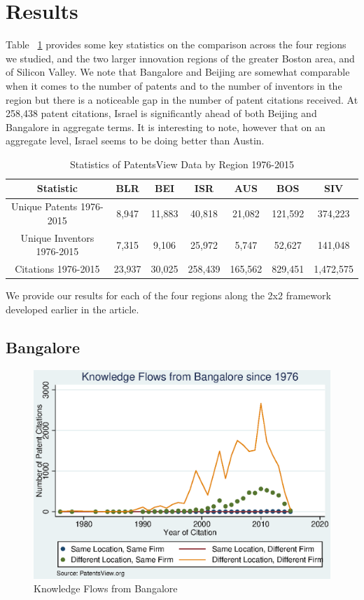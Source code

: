 \documentclass[12pt]{article}
\begin{document}
\section{Results}
Table ~\ref{table:regions} provides some key statistics on the comparison across the four regions we studied, and the two larger innovation regions of the greater Boston area, and of Silicon Valley. We note that Bangalore and Beijing are somewhat comparable when it comes to the number of patents and to the number of inventors in the region but there is a noticeable gap in the number of patent citations received. At 258,438 patent citations, Israel is significantly ahead of both Beijing and Bangalore in aggregate terms. It is interesting to note, however that on an aggregate level, Israel seems to be doing better than Austin.


\begin{table}
\begin{centering}
\label{table:regions}
\begin{tabular}{|c|c|c|c|c|c|c|}
\hline
Statistic&BLR&BEI&ISR&AUS&BOS&SIV\\ \hline
Unique Patents 1976-2015&8,947&11,883&40,818&21,082&121,592&374,223 \\ \hline
Unique Inventors 1976-2015&7,315&9,106&25,972&5,747&52,627&141,048\\ \hline
Citations 1976-2015&23,937&30,025&258,439&165,562&829,451&1,472,575\\ \hline
\end{tabular}
\caption {Statistics of PatentsView Data by Region 1976-2015}
\end{centering}
\end{table}

We provide our results for each of the four regions along the 2x2 framework developed earlier in the article. 
\subsection{Bangalore}

\begin{figure}[h]
\begin{centering}
  \includegraphics[width=\textwidth]{Bangalore1976}
  \caption{Knowledge Flows from Bangalore}
  \label{fig:Bangalore1976}
\end{centering}
\end{figure}
\end{document}
